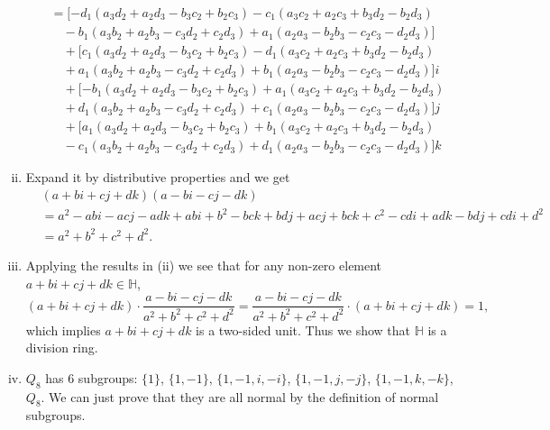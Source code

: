 \documentclass[12pt,letterpaper,boxed]{hmcpset}
\begin{document}
\begin{solution}
\begin{enumerate}[(i)]
\begin{align*}
		&=[-d_1 \left(a_3 d_2+a_2 d_3-b_3
		c_2+b_2 c_3\right)-c_1 \left(a_3 c_2+a_2 c_3+b_3 d_2-b_2
		d_3\right)\\
		&\hspace{1em}-b_1 \left(a_3 b_2+a_2 b_3-c_3 d_2+c_2
		d_3\right)+a_1 \left(a_2 a_3-b_2 b_3-c_2 c_3-d_2
		d_3\right) ]\\
		&\hspace{1em}+[c_1 \left(a_3 d_2+a_2 d_3-b_3 c_2+b_2
		c_3\right)-d_1 \left(a_3 c_2+a_2 c_3+b_3 d_2-b_2
		d_3\right)\\
		&\hspace{1em}+a_1 \left(a_3 b_2+a_2 b_3-c_3 d_2+c_2
		d_3\right)+b_1 \left(a_2 a_3-b_2 b_3-c_2 c_3-d_2
		d_3\right) ]i\\
		&\hspace{1em}+[-b_1 \left(a_3 d_2+a_2 d_3-b_3 c_2+b_2
		c_3\right)+a_1 \left(a_3 c_2+a_2 c_3+b_3 d_2-b_2
		d_3\right)\\
		&\hspace{1em}+d_1 \left(a_3 b_2+a_2 b_3-c_3 d_2+c_2
		d_3\right)+c_1 \left(a_2 a_3-b_2 b_3-c_2 c_3-d_2
		d_3\right)]j\\
		&\hspace{1em}+[a_1 \left(a_3 d_2+a_2 d_3-b_3 c_2+b_2
		c_3\right)+b_1 \left(a_3 c_2+a_2 c_3+b_3 d_2-b_2
		d_3\right)\\
		&\hspace{1em}-c_1 \left(a_3 b_2+a_2 b_3-c_3 d_2+c_2
		d_3\right)+d_1 \left(a_2 a_3-b_2 b_3-c_2 c_3-d_2
		d_3\right) ]k
		\end{align*}
		\item Expand it by distributive properties and we get
		\begin{align*}
			&(a+b i+c j+d k)(a-b i-c j-d k)\\
			&=a^2-abi-acj-adk+abi+b^2-bck+bdj+acj+bck+c^2-cdi+adk-bdj+cdi+d^2\\
			&=a^2+b^2+c^2+d^2.
		\end{align*}
		\item Applying the results in (ii) we see that for any non-zero element $a+b i+c j+d k\in\mathbb{H}$,
		\[
		(a+b i+c j+d k)\cdot\frac{a-b i-c j-d k}{a^2+b^2+c^2+d^2}=\frac{a-b i-c j-d k}{a^2+b^2+c^2+d^2}\cdot(a+b i+c j+d k)=1,
		\]
		which implies $a+b i+c j+d k$ is a two-sided unit. Thus we show that $\mathbb{H}$ is a division ring. 
		\item $Q_8$ has 6 subgroups: $\{1\}$, $\{1,-1\}$, $\{1,-1,i,-i\}$, $\{1,-1,j,-j\}$, $\{1,-1,k,-k\}$, $Q_8$. We can just prove that they are all normal by the definition of normal subgroups.

\end{enumerate}
\end{solution}
\end{document}
